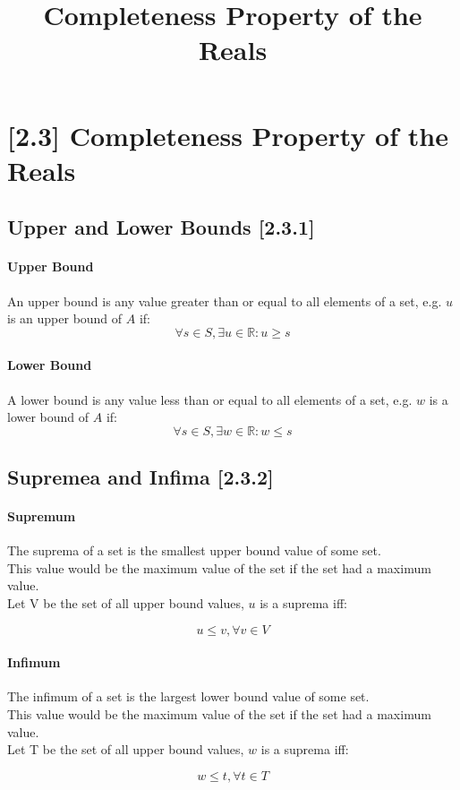 \documentclass{article}
\title{Completeness Property of the Reals}
\begin{document}
	\section{[2.3] Completeness Property of the Reals}
	\subsection{Upper and Lower Bounds [2.3.1]}
	\paragraph{Upper Bound}
	An upper bound is any value greater than or equal to all elements of a set, e.g. $u$ is an upper bound of $A$ if: \\

	\begin{equation}
	  \forall s \in S, \exists u \in \mathbb{R} : u \geq s
	  \label{upperdef}
	\end{equation}


	\paragraph{Lower Bound}
	A lower bound is any value less than or equal to all elements of a set, e.g. $w$ is a lower bound of $A$ if: \\

	\begin{equation}
	  \forall s \in S, \exists w \in \mathbb{R} : w \leq s
	  \label{lowerdef}
	\end{equation}


	\subsection{Supremea and Infima [2.3.2]}
	\paragraph{Supremum}
	The suprema of a set is the smallest upper bound value of some set.\\ 
	This value would be the maximum value of the set if the set had a maximum value.\\
	Let V be the set of all upper bound values, $u$ is a suprema iff:

	\begin{equation}
	  u \leq v, \forall v \in V 
	  \label{supdef}
	\end{equation}

	\paragraph{Infimum}
	The infimum of a set is the largest lower bound value of some set. \\
	This value would be the maximum value of the set if the set had a maximum value.\\
	Let T be the set of all upper bound values, $w$ is a suprema iff:

	\begin{equation}
	  w \leq t, \forall t \in T 
	  \label{infdef}
	\end{equation}

	
\end{document}
